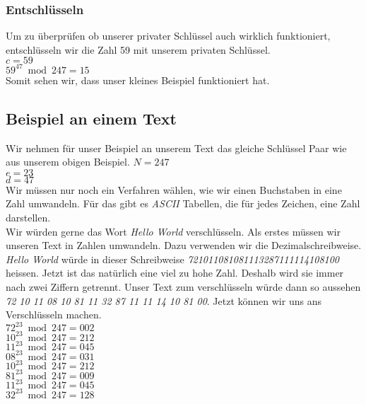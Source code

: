 \subsubsection{Entschlüsseln}
Um zu überprüfen ob unserer privater Schlüssel auch wirklich funktioniert, entschlüsseln wir die Zahl 59 mit unserem privaten Schlüssel.\\
$ c = 59 $ \\
$ 59^{47} \bmod 247 = 15$ \\
Somit sehen wir, dass unser kleines Beispiel funktioniert hat.
\subsection{Beispiel an einem Text}
Wir nehmen für unser Beispiel an unserem Text das gleiche Schlüssel Paar wie aus unserem obigen Beispiel.
$ N = 247 $\\
$ e = 23 $\\
$ d = 47 $\\
Wir müssen nur noch ein Verfahren wählen, wie wir einen Buchstaben in eine Zahl umwandeln. Für das gibt es \textit{ASCII} Tabellen, die für jedes Zeichen, eine Zahl darstellen.\\
Wir würden gerne das Wort \textit{Hello World} verschlüsseln. Als erstes müssen wir unseren Text in Zahlen umwandeln. Dazu verwenden wir die Dezimalschreibweise.\\
\textit{Hello World} würde in dieser Schreibweise \textit{721011081081113287111114108100} heissen. Jetzt ist das natürlich eine viel zu hohe Zahl. Deshalb wird sie immer nach zwei Ziffern getrennt. Unser Text zum verschlüsseln würde dann so aussehen \textit{72 10 11 08 10 81 11 32 87 11 11 14 10 81 00}. Jetzt können wir uns ans Verschlüsseln machen. \\
$ 72^{23} \bmod 247 = 002 $ \\
$ 10^{23} \bmod 247 = 212 $ \\
$ 11^{23} \bmod 247 = 045 $ \\
$ 08^{23} \bmod 247 = 031 $ \\
$ 10^{23} \bmod 247 = 212 $ \\
$ 81^{23} \bmod 247 = 009 $ \\
$ 11^{23} \bmod 247 = 045 $ \\
$ 32^{23} \bmod 247 = 128 $ \\
